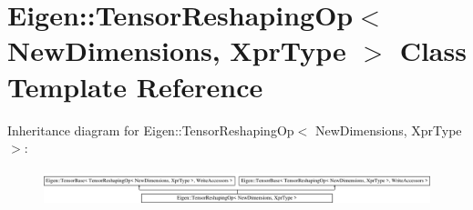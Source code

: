 \hypertarget{class_eigen_1_1_tensor_reshaping_op}{}\section{Eigen\+:\+:Tensor\+Reshaping\+Op$<$ New\+Dimensions, Xpr\+Type $>$ Class Template Reference}
\label{class_eigen_1_1_tensor_reshaping_op}
Inheritance diagram for Eigen\+:\+:Tensor\+Reshaping\+Op$<$ New\+Dimensions, Xpr\+Type $>$\+:\begin{figure}[H]
\begin{center}
\leavevmode
\includegraphics[height=1.050657cm]{class_eigen_1_1_tensor_reshaping_op}
\end{center}
\end{figure}
